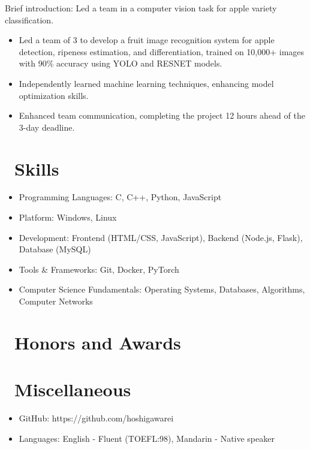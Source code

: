 \documentclass{resume}
\begin{document}
Brief introduction: Led a team in a computer vision task for apple variety classification. 
\begin{itemize}
  \item Led a team of 3 to develop a fruit image recognition system for apple detection, ripeness estimation, and differentiation, trained on 10,000+ images with 90\% accuracy using YOLO and RESNET models.  
  \item Independently learned machine learning techniques, enhancing model optimization skills.
  \item Enhanced team communication, completing the project 12 hours ahead of the 3-day deadline.
\end{itemize}


\section{\faCogs\ Skills}
\begin{itemize}[parsep=0.5ex]
  \item Programming Languages: C, C++, Python, JavaScript
  \item Platform: Windows, Linux
  \item Development: Frontend (HTML/CSS, JavaScript), Backend (Node.js, Flask), Database (MySQL)
  \item Tools \& Frameworks: Git, Docker, PyTorch
  \item Computer Science Fundamentals: Operating Systems, Databases, Algorithms, Computer Networks
\end{itemize}

\section{\faHeartO\ Honors and Awards}

\section{\faInfo\ Miscellaneous}
\begin{itemize}[parsep=0.5ex]
  \item GitHub: https://github.com/hoshigawarei
  \item Languages: English - Fluent (TOEFL:98), Mandarin - Native speaker
\end{itemize}

%
%
\end{document}

